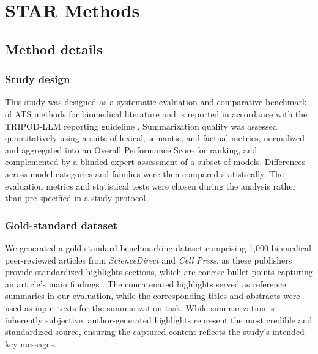 \section{STAR Methods}

\subsection{Method details}

\subsubsection{Study design}

This study was designed as a systematic evaluation and comparative benchmark of \ac{ATS} methods for biomedical literature and is reported in accordance with the \ac{TRIPOD}-\ac{LLM} reporting guideline \cite{7c5a06320cd743b7b87b80447ac0f055}. Summarization quality was assessed quantitatively using a suite of lexical, semantic, and factual metrics, normalized and aggregated into an Overall Performance Score for ranking, and complemented by a blinded expert assessment of a subset of models. Differences across model categories and families were then compared statistically. The evaluation metrics and statistical tests were chosen during the analysis rather than pre-specified in a study protocol.

\subsubsection{Gold-standard dataset}

We generated a gold-standard benchmarking dataset comprising 1,000 biomedical peer-reviewed articles from \textit{ScienceDirect} and \textit{Cell Press}, as these publishers provide standardized highlights sections, which are concise bullet points capturing an article's main findings \cite{ElsevierHighlights, CellPressHighlights}. The concatenated highlights served as reference summaries in our evaluation, while the corresponding titles and abstracts were used as input texts for the summarization task. While summarization is inherently subjective, author-generated highlights represent the most credible and standardized source, ensuring the captured content reflects the study's intended key messages.

